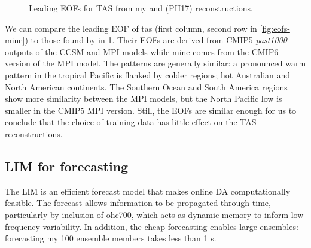 \documentclass[parskip=half,DIV=16]{scrartcl}
\begin{document}
\begin{figure}[h]
\begin{subfigure}[c]{0.3\textwidth}
     \end{subfigure}

    \caption{Leading EOFs for TAS from my and \textcite{Perkins2017} (PH17) reconstructions.}
    \label{fig:eofs-ph}
\end{figure}

We can compare the leading \gls{EOF} of tas (first column, second row in \cref{fig:eofs-mine}) to those found by \textcite{Perkins2017} in \cref{fig:eofs-ph}. Their \glspl{EOF} are derived from CMIP5 \emph{past1000} outputs of the CCSM and MPI models while mine comes from the CMIP6 version of the MPI model. The patterns are generally similar: a pronounced warm pattern in the tropical Pacific is flanked by colder regions; hot Australian and North American continents. The Southern Ocean and South America regions show more similarity between the MPI models, but the North Pacific low is smaller in the CMIP5 MPI version. Still, the \glspl{EOF} are similar enough for us to conclude that the choice of training data has little effect on the TAS reconstructions.



\subsection{LIM for forecasting}
\label{subsec:setup-lim}

The \gls{LIM} is an efficient forecast model that makes online \gls{DA} computationally feasible. The forecast allows information to be propagated through time, particularly by inclusion of ohc700, which acts as dynamic memory to inform low-frequency variability. In addition, the cheap forecasting enables large ensembles: forecasting my 100 ensemble members takes less than 1 s.
\end{document}
